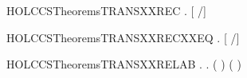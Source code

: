 \newcommand{\HOLCCSTheoremsTRANSXXPROC}{\UseVerbatim{HOLCCSTheoremsTRANSXXPROC}}
\begin{SaveVerbatim}{HOLCCSTheoremsTRANSXXREC}
\HOLTokenTurnstile{} \HOLSymConst{\HOLTokenForall{}}   .    \HOLTokenTransBegin{}\HOLTokenTransEnd {} \HOLSymConst{\HOLTokenImp{}} [  /]  \HOLTokenTransBegin{}\HOLTokenTransEnd {}
\end{SaveVerbatim}
\newcommand{\HOLCCSTheoremsTRANSXXREC}{\UseVerbatim{HOLCCSTheoremsTRANSXXREC}}
\begin{SaveVerbatim}{HOLCCSTheoremsTRANSXXRECXXEQ}
\HOLTokenTurnstile{} \HOLSymConst{\HOLTokenForall{}}   .    \HOLTokenTransBegin{}\HOLTokenTransEnd {} \HOLSymConst{\HOLTokenEquiv{}} [  /]  \HOLTokenTransBegin{}\HOLTokenTransEnd {}
\end{SaveVerbatim}
\newcommand{\HOLCCSTheoremsTRANSXXRECXXEQ}{\UseVerbatim{HOLCCSTheoremsTRANSXXRECXXEQ}}
\begin{SaveVerbatim}{HOLCCSTheoremsTRANSXXRELAB}
\HOLTokenTurnstile{} \HOLSymConst{\HOLTokenForall{}}   .
          \HOLTokenTransBegin{}\HOLTokenTransEnd {} \HOLSymConst{\HOLTokenImp{}}
       \HOLSymConst{\HOLTokenExists{}} .
           ( \HOLSymConst{=}   ) \HOLSymConst{\HOLTokenConj{}} ( \HOLSymConst{=}   ) \HOLSymConst{\HOLTokenConj{}}
            \HOLTokenTransBegin{}\HOLTokenTransEnd {}
\end{SaveVerbatim}
\newcommand{\HOLCCSTheoremsTRANSXXRELAB}{\UseVerbatim{HOLCCSTheoremsTRANSXXRELAB}}
